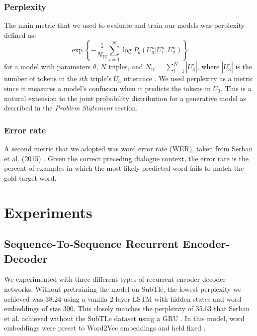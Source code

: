 \documentclass[11pt]{article}
\begin{document}
\subsubsection{Perplexity}

The main metric that we used to evaluate and train our models was perplexity defined as:
$$\exp\left\{-\frac{1}{N_W}\sum\limits_{i=1}^N\log P_\theta(U_3^n| U_1^n, U_2^n)\right\}$$
for a model with parameters $\theta$, $N$ triples, and $N_W = \sum\limits_{i=1}^N|U_3^i|$, where $|U_3^i|$ is the number of tokens in the $ith$ triple's $U_3$ utterance \cite{serban}. We used perplexity as a metric since it measures a model's confusion when it predicts the tokens in $U_3$. This is a natural extension to the joint probability distribution for a generative model as described in the {\it Problem Statement} section.

\subsubsection{Error rate}

A second metric that we adopted was word error rate (WER), taken from Serban et al. (2015) \cite{serban}. Given the correct preceding dialogue context, the error rate is the percent of examples in which the most likely predicted word fails to match the gold target word.

\section{Experiments}

\subsection{Sequence-To-Sequence Recurrent Encoder-Decoder}

We experimented with three different types of recurrent encoder-decoder networks. Without pretraining the model on SubTle, the lowest perplexity we achieved was 38.24 using a vanilla 2-layer LSTM with hidden states and word embeddings of size 300. This closely matches the perplexity of 35.63 that Serban et al. achieved without the SubTLe dataset using a GRU \cite{serban}. In this model, word embeddings were preset to Word2Vec embeddings and held fixed \cite{word2vec}.
\end{document}
